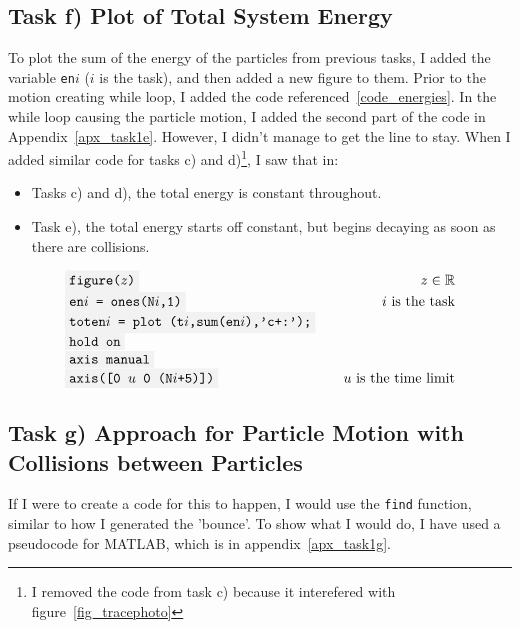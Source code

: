 \documentclass[10pt,a4paper]{article}
\newcommand{\code}[1]{\colorbox{light-gray}{\texttt{#1}}}
\begin{document}
	
	\subsection{Task f) Plot of Total System Energy} %
	
	To plot the sum of the energy of the particles from previous tasks, I added the variable \code{en$i$} ($i$ is the task), and then added a new figure to them. Prior to the motion creating while loop, I added the code referenced~\ref{code_energies}. In the while loop causing the particle motion, I added the second part of the code in Appendix~\ref{apx_task1e}. However, I didn't manage to get the line to stay. When I added similar code for tasks c) and d)\footnote{I removed the code from task c) because it interefered with figure~\ref{fig_tracephoto}}, I saw that in: 
	\begin{itemize}
		\item Tasks c) and d), the total energy is constant throughout.
		\item Task e), the total energy starts off constant, but begins decaying as soon as there are collisions. 
	\end{itemize}
	
	\begin{equation}
	\label{code_energies}
	\begin{array}{llrr}
	\code{figure($z$)} 					&&z \in \mathbb{R}\\
	\code{en$i$ = ones(N$i$,1)} 	&& i\text{ is the task}\\
	\code{toten$i$ = plot (t$i$,sum(en$i$),'c+:');}	&&\\
	\code{hold on}							&&\\
	\code{axis manual}						&&\\
	\code{axis([0 $u$ 0 (N$i$+5)])} && u\text{ is the time limit}
	\end{array}
	\end{equation}

	
	\subsection{Task g) Approach for Particle Motion with Collisions between Particles} %
		
	If I were to create a code for this to happen, I would use the \code{find} function, similar to how I generated the 'bounce'. To show what I would do, I have used a pseudocode for MATLAB\textregistered, which is in appendix~\ref{apx_task1g}. 
	
\end{document}
